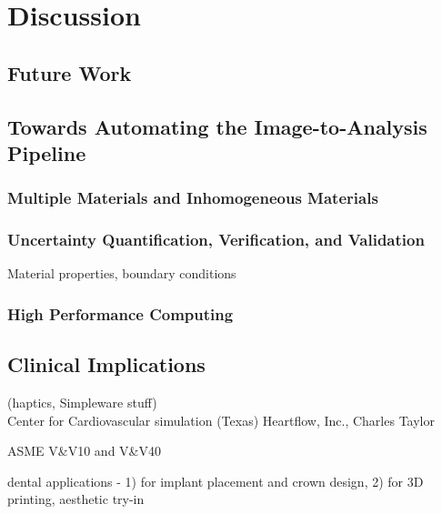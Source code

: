 \chapter{Discussion}
%

\section{Future Work}
\label{Future Work}
\section{Towards Automating the Image-to-Analysis Pipeline}
\label{Towards Automating the Image-to-Analysis Pipeline}
\subsection{Multiple Materials and Inhomogeneous Materials}
\label{Multiple Materials and Inhomogeneous Materials}
\subsection{Uncertainty Quantification, Verification, and Validation}
\label{Uncertainty Quantification, Verification, and Validation}
Material properties, boundary conditions
\subsection{High Performance Computing}
\label{High Performance Computing}
\section{Clinical Implications}
\label{Clinical Implications}
(haptics, Simpleware stuff)\\
Center for Cardiovascular simulation (Texas)
Heartflow, Inc., Charles Taylor

ASME V&V10 and V&V40

dental applications - 1) for implant placement and crown design, 2) for 3D printing, aesthetic try-in
